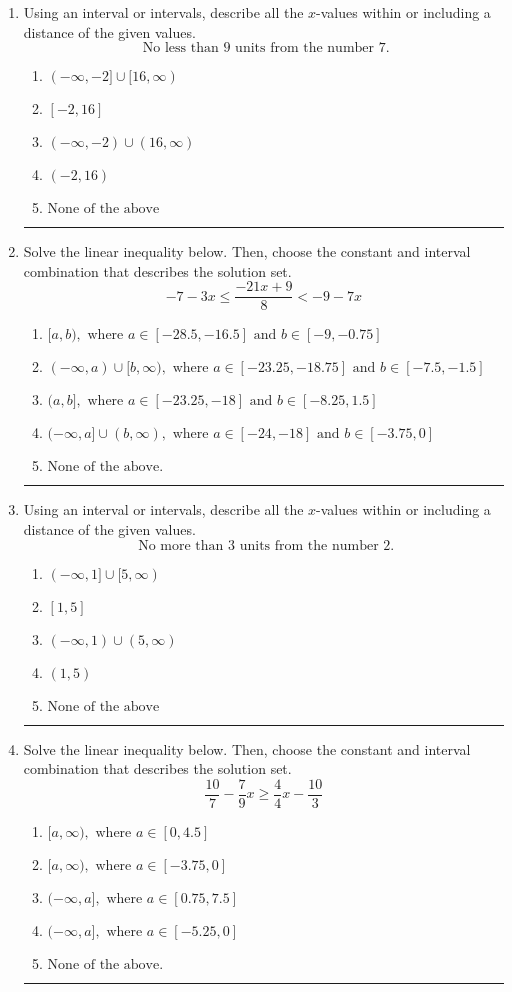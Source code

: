 \documentclass[14pt]{extbook}
\newcommand{\litem}[1]{\item#1\hspace*{-1cm}\rule{\textwidth}{0.4pt}}
\begin{document}
\begin{enumerate}
{\begin{enumerate}[label=\Alph*.]
\end{enumerate} }
\litem{
Using an interval or intervals, describe all the $x$-values within or including a distance of the given values.\[ \text{ No less than } 9 \text{ units from the number } 7. \]\begin{enumerate}[label=\Alph*.]
\item \( (-\infty, -2] \cup [16, \infty) \)
\item \( [-2, 16] \)
\item \( (-\infty, -2) \cup (16, \infty) \)
\item \( (-2, 16) \)
\item \( \text{None of the above} \)

\end{enumerate} }
\litem{
Solve the linear inequality below. Then, choose the constant and interval combination that describes the solution set.\[ -7 - 3 x \leq \frac{-21 x + 9}{8} < -9 - 7 x \]\begin{enumerate}[label=\Alph*.]
\item \( [a, b), \text{ where } a \in [-28.5, -16.5] \text{ and } b \in [-9, -0.75] \)
\item \( (-\infty, a) \cup [b, \infty), \text{ where } a \in [-23.25, -18.75] \text{ and } b \in [-7.5, -1.5] \)
\item \( (a, b], \text{ where } a \in [-23.25, -18] \text{ and } b \in [-8.25, 1.5] \)
\item \( (-\infty, a] \cup (b, \infty), \text{ where } a \in [-24, -18] \text{ and } b \in [-3.75, 0] \)
\item \( \text{None of the above.} \)

\end{enumerate} }
\litem{
Using an interval or intervals, describe all the $x$-values within or including a distance of the given values.\[ \text{ No more than } 3 \text{ units from the number } 2. \]\begin{enumerate}[label=\Alph*.]
\item \( (-\infty, 1] \cup [5, \infty) \)
\item \( [1, 5] \)
\item \( (-\infty, 1) \cup (5, \infty) \)
\item \( (1, 5) \)
\item \( \text{None of the above} \)

\end{enumerate} }
\litem{
Solve the linear inequality below. Then, choose the constant and interval combination that describes the solution set.\[ \frac{10}{7} - \frac{7}{9} x \geq \frac{4}{4} x - \frac{10}{3} \]\begin{enumerate}[label=\Alph*.]
\item \( [a, \infty), \text{ where } a \in [0, 4.5] \)
\item \( [a, \infty), \text{ where } a \in [-3.75, 0] \)
\item \( (-\infty, a], \text{ where } a \in [0.75, 7.5] \)
\item \( (-\infty, a], \text{ where } a \in [-5.25, 0] \)
\item \( \text{None of the above}. \)


\end{enumerate}}
\end{enumerate}
\end{document}
